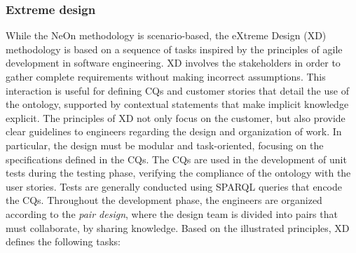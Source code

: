 \subsubsection{Extreme design}
While the NeOn methodology is scenario-based, the eXtreme Design (XD) methodology \cite{presutti2009extreme} is based on a sequence of tasks inspired by the principles of agile development in software engineering.
XD involves the stakeholders in order to gather complete requirements without making incorrect assumptions.
This interaction is useful for defining CQs and customer stories that detail the use of the ontology, supported by contextual statements that make implicit knowledge explicit.
The principles of XD not only focus on the customer, but also provide clear guidelines to engineers regarding the design and organization of work.
In particular, the design must be modular and task-oriented, focusing on the specifications defined in the CQs.
The CQs are used in the development of unit tests during the testing phase, verifying the compliance of the ontology with the user stories.
Tests are generally conducted using SPARQL queries that encode the CQs.
Throughout the development phase, the engineers are organized according to the \textit{pair design}, where the design team is divided into pairs that must collaborate, by sharing knowledge.
Based on the illustrated principles, XD defines the following tasks: 
